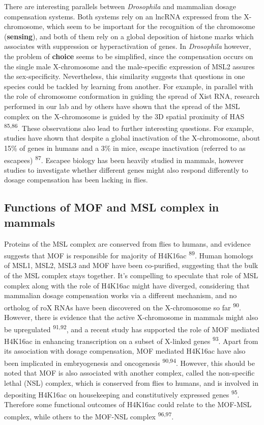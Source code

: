 \documentclass[11pt,twoside]{MPIthesis}
\theoremstyle{definition}
\theoremstyle{definition}
\theoremstyle{definition}
\theoremstyle{remark}
\begin{document}
There are interesting parallels between \emph{Drosophila} and mammalian
dosage compensation systems. Both systems rely on an lncRNA expressed
from the X-chromosome, which seem to be important for the recognition of
the chromosome (\textbf{sensing}), and both of them rely on a global
deposition of histone marks which associates with suppression or
hyperactivation of genes. In \emph{Drosophila} however, the problem of
\textbf{choice} seems to be simplified, since the compensation occurs on
the single male X-chromosome and the male-specific expression of MSL2
assures the sex-specificity. Nevertheless, this similarity suggests that
questions in one species could be tackled by learning from another. For
example, in parallel with the role of chromosome conformation in guiding
the spread of Xist RNA, research performed in our lab and by others have
shown that the spread of the MSL complex on the X-chromosome is guided
by the 3D spatial proximity of HAS \textsuperscript{85,86}. These
observations also lead to further interesting questions. For example,
studies have shown that despite a global inactivation of the
X-chromosome, about 15\% of genes in humans and a 3\% in mice, escape
inactivation (referred to as escapees) \textsuperscript{87}. Escapee
biology has been heavily studied in mammals, however studies to
investigate whether different genes might also respond differently to
dosage compensation has been lacking in flies.

\subsection{Functions of MOF and MSL complex in
mammals}\label{functions-of-mof-and-msl-complex-in-mammals}

Proteins of the MSL complex are conserved from flies to humans, and
evidence suggests that MOF is responsible for majority of H4K16ac
\textsuperscript{89}. Human homologs of MSL1, MSL2, MSL3 and MOF have
been co-purified, suggesting that the bulk of the MSL complex stays
together. It's compelling to speculate that role of MSL complex along
with the role of H4K16ac might have diverged, considering that mammalian
dosage compensation works via a different mechanism, and no ortholog of
roX RNAs have been discovered on the X-chromosome so far
\textsuperscript{90}. However, there is evidence that the active
X-chromosome in mammals might also be upregulated
\textsuperscript{91,92}, and a recent study has supported the role of
MOF mediated H4K16ac in enhancing transcription on a subset of X-linked
genes \textsuperscript{93}. Apart from its association with dosage
compensation, MOF mediated H4K16ac have also been implicated in
embryogenesis and oncogenesis \textsuperscript{90,94}. However, this
should be noted that MOF is also associated with another complex, called
the non-specific lethal (NSL) complex, which is conserved from flies to
humans, and is involved in depositing H4K16ac on housekeeping and
constitutively expressed genes \textsuperscript{95}. Therefore some
functional outcomes of H4K16ac could relate to the MOF-MSL complex,
while others to the MOF-NSL complex \textsuperscript{96,97}.
\end{document}
